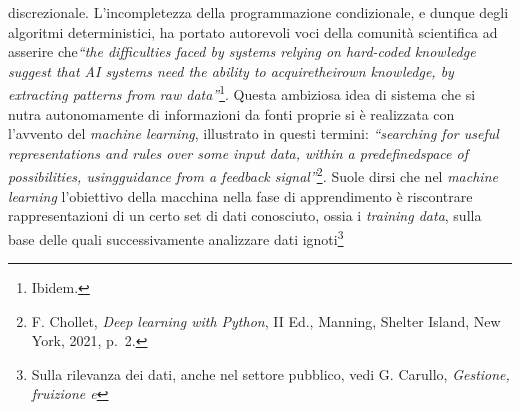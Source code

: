 \documentclass[american,a4paper,]{article}
\begin{document}
discrezionale. L'incompletezza della programmazione condizionale, e dunque degli algoritmi deterministici, ha portato autorevoli voci della comunità scientifica ad asserire che\emph{``the difficulties faced by systems relying on hard-coded knowledge suggest that AI systems need the ability to acquiretheirown knowledge, by extracting patterns from raw data''}\footnote{Ibidem.}. Questa ambiziosa idea di sistema che si nutra autonomamente di informazioni da fonti proprie si è realizzata con l'avvento del \emph{machine learning}, illustrato in questi termini: \emph{``searching for useful representations and rules over some input data, within a predefinedspace of possibilities, usingguidance from a feedback signal''}\footnote{F. Chollet, \emph{Deep learning with Python}, II Ed., Manning, Shelter Island, New York, 2021, p.~2.}\emph{.} Suole dirsi che nel \emph{machine learning} l'obiettivo della macchina nella fase di apprendimento è riscontrare rappresentazioni di un certo set di dati conosciuto, ossia i \emph{training data}, sulla base delle quali successivamente analizzare dati ignoti\footnote{Sulla rilevanza dei dati, anche nel settore pubblico, vedi G. Carullo, \emph{Gestione, fruizione e}

}
\end{document}
